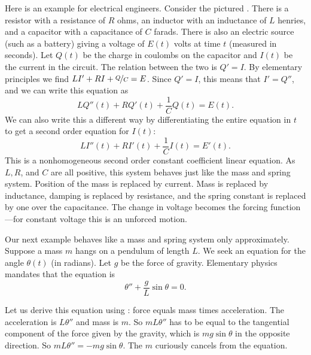 \begin{mywrapfigsimp}[5]{1.35in}{1.65in}
\noindent
{}
\end{mywrapfigsimp}
Here is an example for electrical engineers.  Consider the
pictured .
There is a resistor with a resistance of $R$ ohms, an
inductor with an inductance of $L$ henries,
and a capacitor with a capacitance of $C$ farads.  There is also
an electric source (such as a battery) giving a voltage of $E(t)$ volts
at time $t$ (measured in seconds).
Let $Q(t)$ be the charge in coulombs on the capacitor
and $I(t)$ be the current in the circuit.  The relation between the two is
$Q' = I$.  By elementary principles we find 
$L I' + RI + \nicefrac{Q}{C} = E$. Since $Q' = I$, this means that $I' = Q''$, and we can write this equation as
\begin{equation*}
LQ''(t) + RQ'(t) + \frac{1}{C}Q(t) = E(t).
\end{equation*}   We can also write this a different way by differentiating the entire equation in $t$ to get a second order equation for $I(t)$: 
\begin{equation*}
L I''(t) + R I'(t) + \frac{1}{C} I(t) = E'(t) .
\end{equation*}
This is a nonhomogeneous second order constant coefficient linear equation.
As $L, R$, and $C$ are all positive, this system behaves just like the
mass and spring system.  Position of the mass is replaced by current.
Mass is replaced by inductance, damping is replaced by resistance, and
the spring constant is replaced by one over the capacitance.  The change in
voltage becomes the forcing function---for constant voltage this is an
unforced motion.

\medskip

\begin{mywrapfigsimp}[10]{1.8in}{2.16in}
\noindent
{}
\end{mywrapfigsimp}
Our next example behaves like a mass and spring system only
approximately. Suppose a
mass $m$ hangs on a pendulum of length $L$.  We seek an equation for
the angle $\theta(t)$ (in radians).  Let $g$ be the force of gravity.
Elementary physics mandates that the equation is
\begin{equation*}
\theta'' + \frac{g}{L} \sin \theta = 0 .
\end{equation*}

Let us derive this equation using :
force equals mass times acceleration.  The acceleration is
$L \theta''$ and mass is $m$.  So $mL\theta''$ has to be equal
to the tangential component of the force given by the gravity, which is
$m g \sin \theta$ in the opposite direction.
So $mL\theta'' = -mg \sin \theta$.
The $m$ curiously cancels from the equation.

